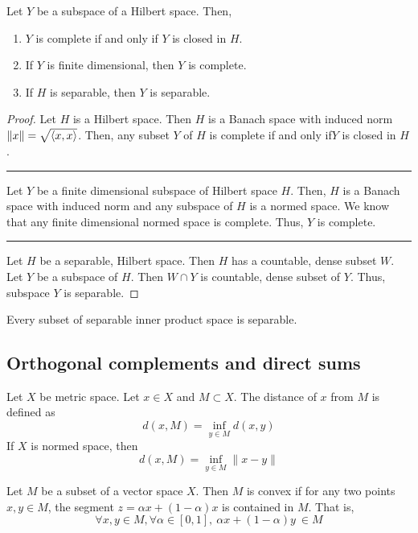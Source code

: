 \begin{theorem}
	Let $Y$ be a subspace of a Hilbert space.
	Then,
	\begin{enumerate}
		\item $Y$ is complete if and only if $Y$ is closed in $H$.
		\item If $Y$ is finite dimensional, then $Y$ is complete.
		\item If $H$ is separable, then $Y$ is separable.
	\end{enumerate}
\end{theorem}
\begin{proof}
	Let $H$ is a Hilbert space.
	Then $H$ is a Banach space with induced norm $\|x\| = \sqrt{\left\langle x,x \right\rangle}$.
	Then, any subset $Y$ of $H$ is complete if and only if$Y$ is closed in $H$.\\

	\hrule \vspace{1em}

	Let $Y$ be a finite dimensional subspace of Hilbert space $H$.
	Then, $H$ is a Banach space with induced norm and any subspace of $H$ is a normed space.
	We know that any finite dimensional normed space is complete.
	Thus, $Y$ is complete.\\

	\hrule \vspace{1em}

	Let $H$ be a separable, Hilbert space.
	Then $H$ has a countable, dense subset $W$.
	Let $Y$ be a subspace of $H$.
	Then $W \cap Y$ is countable, dense subset of $Y$.
	Thus, subspace $Y$ is separable.
\end{proof}

\begin{important}
	Every subset of separable inner product space is separable.
\end{important}

\subsection{Orthogonal complements and direct sums}
\begin{definition}
	Let $X$ be metric space.
	Let $x \in X$ and $M \subset X$.
	The distance of $x$ from $M$ is defined as
	\[ d(x,M) = \inf_{y \in M} d(x,y) \]
	If $X$ is normed space, then 
	\[ d(x,M) = \inf_{y \in M}\|x-y\| \]
\end{definition}

\begin{definition}[convex]
	Let $M$ be a subset of a vector space $X$.
	Then $M$ is convex if for any two points $x,y \in M$, the segment $z = \alpha x + (1-\alpha)x$ is contained in $M$.
	That is,
	\[ \forall x,y \in M, \forall \alpha \in [0,1],\ \alpha x + (1-\alpha)y \ \in M \]
\end{definition}

